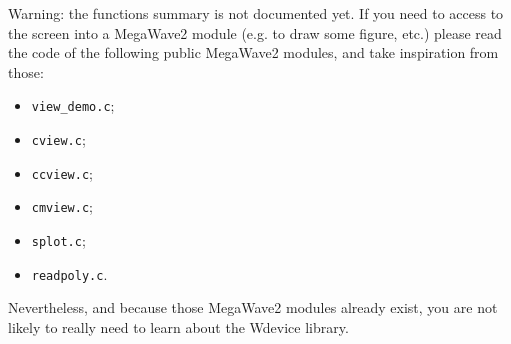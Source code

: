 Warning: the functions summary is not documented yet. 
If you need to access to the screen into a MegaWave2 module (e.g. to draw some figure, etc.) please read the code of the following public MegaWave2 modules, and take inspiration from those:
\begin{itemize}
\item \verb+view_demo.c+;
\item \verb+cview.c+;
\item \verb+ccview.c+;
\item \verb+cmview.c+;
\item \verb+splot.c+;
\item \verb+readpoly.c+.
\end{itemize}
Nevertheless, and because those MegaWave2 modules already exist, you are not likely to really need to learn about the Wdevice library.


\newpage %

%
